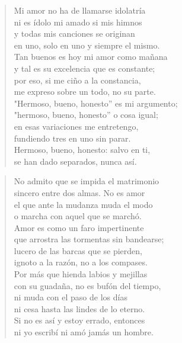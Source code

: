 \documentclass[12pt]{article}
\begin{document}
\clearpage
{}
\begin{verse}

Mi amor no ha de llamarse idolatría\\
ni es ídolo mi amado si mis himnos\\
y todas mis canciones se originan\\
en uno, solo en uno y siempre el mismo.\\
Tan buenos es hoy mi amor como mañana\\
y tal es su excelencia que es constante;\\
por eso, si me ciño a la constancia,\\
me expreso sobre un todo, no su parte.\\
"Hermoso, bueno, honesto'' es mi argumento;\\
"hermoso, bueno, honesto'' o cosa igual;\\
en esas variaciones me entretengo,\\
fundiendo tres en uno sin parar.\\
Hermoso, bueno, honesto: salvo en ti,\\
se han dado separados, nunca así.

\end{verse}

\clearpage
{}
\begin{verse}

No admito que se impida el matrimonio\\
sincero entre dos almas. No es amor\\
el que ante la mudanza muda el modo\\
o marcha con aquel que se marchó.\\
Amor es como un faro impertinente\\
que arrostra las tormentas sin bandearse;\\
lucero de las barcas que se pierden,\\
ignoto a la razón, no a los compases.\\
Por más que hienda labios y mejillas\\
con su guadaña, no es bufón del tiempo,\\
ni muda con el paso de los días\\
ni cesa hasta las lindes de lo eterno.\\
Si no es así y estoy errado, entonces\\
ni yo escribí ni amó jamás un hombre.

\end{verse}
\end{document}
